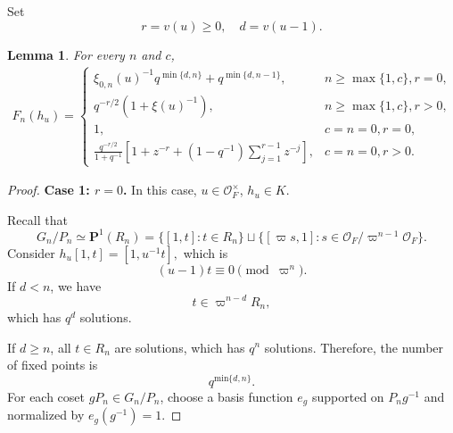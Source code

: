 \documentclass[11pt]{amsart}
\newtheorem {lemma}      [theorem]    {Lemma}
\renewcommand{\rm}{\mathrm}
\theoremstyle{definition}
\numberwithin{equation}{section}
\begin{document}
	Set \[r=v(u)\ge 0,\quad d=v(u-1).\]
	\begin{lemma}
		For every \(n\) and \(c\),
		\begin{align*}
			F_n(h_u) = \begin{cases} 
				\xi_{0,n}(u)^{-1} q^{\min\{d,n\}} + q^{\min\{d,n-1\}}, & n \ge \max\{1, c\},r = 0, \\ 
				q^{-r/2} \left( 1 + \xi(u)^{-1} \right), &n \ge \max\{1, c\}, r > 0,\\
				1, &c=n=0, r = 0, \\ 
				\frac{q^{-r/2}}{1+q^{-1}} \left[ 1 + z^{-r} + (1-q^{-1}) \sum_{j=1}^{r-1} z^{-j} \right], &c=n=0, r > 0. 
			\end{cases}
		\end{align*}
	\end{lemma}
	\begin{proof}
		\textbf{Case 1: $r=0$.}
		In this case, \(u\in \mathcal{O}_F^\times\), \(h_u\in K\).
		
		Recall that 
		\[G_n/P_n\simeq\mathbf{P}^1(R_n) = \{ [1 ,t] : t \in R_n \} \sqcup \{ [\varpi s,1] : s \in \mathcal{O}_F/\varpi^{n-1}\mathcal{O}_F \}.\]
		Consider \(h_u[1,t] = [1,u^{-1}t],\) which is \[(u-1)t \equiv 0 \pmod{\varpi^n}.\]
		If \(d < n\), we have
		\[
		t \in \varpi^{n-d} R_n,
		\]
		which has \(q^d\) solutions. 
		
		If \(d \ge n\), all \(t \in R_n\) are solutions, which has \(q^n\) solutions. Therefore, the number of fixed points is
		\[
		q^{\rm{min}\{d,n\}}.
		\]
		For each coset $gP_n\in G_n/P_n$, choose a basis function $e_g$ supported on $P_ng^{-1}$ and normalized by $e_g(g^{-1})=1$.
		

\end{proof}
\end{document}
